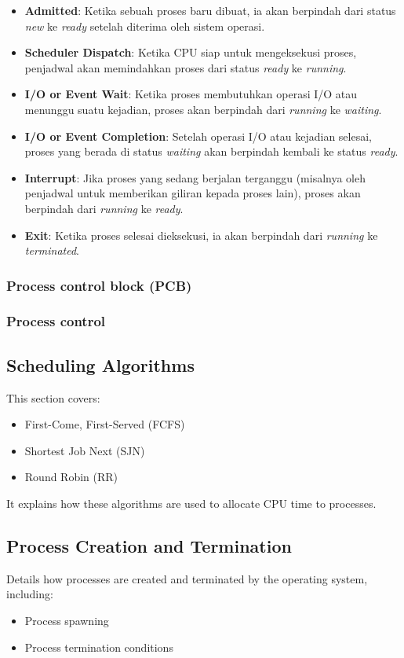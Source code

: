 \documentclass[12pt]{article}
\begin{document}
\begin{itemize}
    \item \textbf{Admitted}: Ketika sebuah proses baru dibuat, ia akan berpindah dari status \textit{new} ke \textit{ready} setelah diterima oleh sistem operasi.
    \item \textbf{Scheduler Dispatch}: Ketika CPU siap untuk mengeksekusi proses, penjadwal akan memindahkan proses dari status \textit{ready} ke \textit{running}.
    \item \textbf{I/O or Event Wait}: Ketika proses membutuhkan operasi I/O atau menunggu suatu kejadian, proses akan berpindah dari \textit{running} ke \textit{waiting}.
    \item \textbf{I/O or Event Completion}: Setelah operasi I/O atau kejadian selesai, proses yang berada di status \textit{waiting} akan berpindah kembali ke status \textit{ready}.
    \item \textbf{Interrupt}: Jika proses yang sedang berjalan terganggu (misalnya oleh penjadwal untuk memberikan giliran kepada proses lain), proses akan berpindah dari \textit{running} ke \textit{ready}.
    \item \textbf{Exit}: Ketika proses selesai dieksekusi, ia akan berpindah dari \textit{running} ke \textit{terminated}.
\end{itemize}
\subsubsection {Process control block (PCB)}
\subsubsection {Process control}

\subsection{Scheduling Algorithms}
This section covers:
\begin{itemize}
    \item First-Come, First-Served (FCFS)
    \item Shortest Job Next (SJN)
    \item Round Robin (RR)
\end{itemize}
It explains how these algorithms are used to allocate CPU time to processes.

\subsection{Process Creation and Termination}
Details how processes are created and terminated by the operating system, including:
\begin{itemize}
    \item Process spawning
    \item Process termination conditions
\end{itemize}
\end{document}
